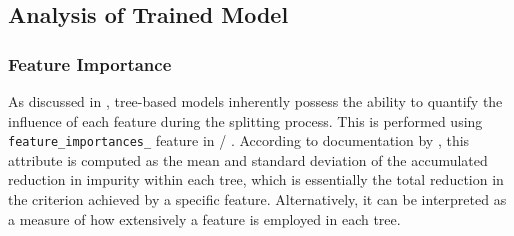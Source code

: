 

\pagebreak

\subsection{Analysis of Trained Model}\label{sec:BBM_model_eval}

\subsubsection{Feature Importance}\label{sec:feature_importance_bbm}

As discussed in , tree-based models inherently possess the ability to quantify the influence of each feature during the splitting process. This is performed using {\tt feature\_importances\_} feature in \scikit/ . According to documentation by , this attribute is computed as the mean and standard deviation of the accumulated reduction in impurity within each tree, which is essentially the total reduction in the criterion achieved by a specific feature. Alternatively, it can be interpreted as a measure of how extensively a feature is employed in each tree.\\

